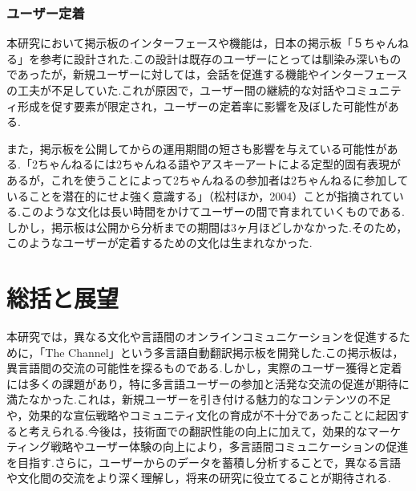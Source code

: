 \documentclass[b5paper,12pt,dvipdfmx]{jsreport}
\begin{document}
\subsubsection{ユーザー定着}
本研究において掲示板のインターフェースや機能は，日本の掲示板「５ちゃんねる」を参考に設計された.この設計は既存のユーザーにとっては馴染み深いものであったが，新規ユーザーに対しては，会話を促進する機能やインターフェースの工夫が不足していた.これが原因で，ユーザー間の継続的な対話やコミュニティ形成を促す要素が限定され，ユーザーの定着率に影響を及ぼした可能性がある.

また，掲示板を公開してからの運用期間の短さも影響を与えている可能性がある.「2ちゃんねるには2ちゃんねる語やアスキーアートによる定型的固有表現があるが，これを使うことによって2ちゃんねるの参加者は2ちゃんねるに参加していることを潜在的にせよ強く意識する」（松村ほか，2004）ことが指摘されている.このような文化は長い時間をかけてユーザーの間で育まれていくものである.しかし，掲示板は公開から分析までの期間は3ヶ月ほどしかなかった.そのため，このようなユーザーが定着するための文化は生まれなかった.

\section{総括と展望}

本研究では，異なる文化や言語間のオンラインコミュニケーションを促進するために，「The Channel」という多言語自動翻訳掲示板を開発した.この掲示板は，異言語間の交流の可能性を探るものである.しかし，実際のユーザー獲得と定着には多くの課題があり，特に多言語ユーザーの参加と活発な交流の促進が期待に満たなかった.これは，新規ユーザーを引き付ける魅力的なコンテンツの不足や，効果的な宣伝戦略やコミュニティ文化の育成が不十分であったことに起因すると考えられる.今後は，技術面での翻訳性能の向上に加えて，効果的なマーケティング戦略やユーザー体験の向上により，多言語間コミュニケーションの促進を目指す.さらに，ユーザーからのデータを蓄積し分析することで，異なる言語や文化間の交流をより深く理解し，将来の研究に役立てることが期待される.

\end{document}
